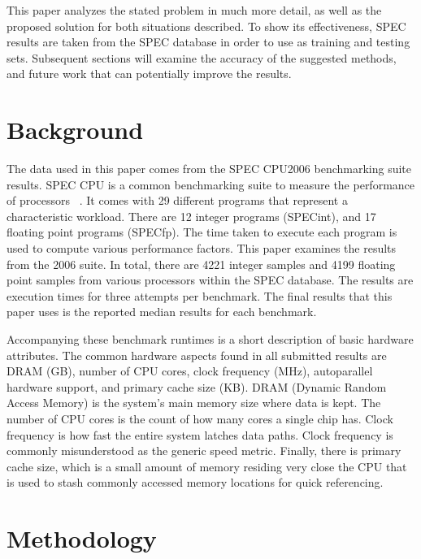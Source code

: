\documentclass[10pt,twocolumn,letterpaper]{article}
\begin{document}
This paper analyzes the stated problem in much more detail, as well as the proposed solution for both situations described.
To show its effectiveness, SPEC results are taken from the SPEC database in order to use as training and testing sets.
Subsequent sections will examine the accuracy of the suggested methods, and future work that can potentially improve the results.

\section{Background}

The data used in this paper comes from the SPEC CPU2006 benchmarking suite results.
SPEC CPU is a common benchmarking suite to measure the performance of processors ~\cite{SPEC_Results}.
It comes with 29 different programs that represent a characteristic workload.
There are 12 integer programs (SPECint), and 17 floating point programs (SPECfp).
The time taken to execute each program is used to compute various performance factors.
This paper examines the results from the 2006 suite.
In total, there are 4221 integer samples and 4199 floating point samples from various processors within the SPEC database.
The results are execution times for three attempts per benchmark.
The final results that this paper uses is the reported median results for each benchmark.

Accompanying these benchmark runtimes is a short description of basic hardware attributes.
The common hardware aspects found in all submitted results are DRAM (GB), number of CPU cores, clock frequency (MHz), autoparallel hardware support, and primary cache size (KB).
DRAM (Dynamic Random Access Memory) is the system’s main memory size where data is kept.
The number of CPU cores is the count of how many cores a single chip has.
Clock frequency is how fast the entire system latches data paths.
Clock frequency is commonly misunderstood as the generic speed metric.
Finally, there is primary cache size, which is a small amount of memory residing very close the CPU that is used to stash commonly accessed memory locations for quick referencing.

\section{Methodology}
\end{document}
